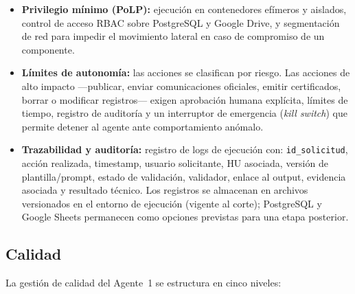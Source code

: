\documentclass[a4paper, 12pt]{article}
\begin{document}
\begin{itemize}
  \item \textbf{Privilegio m\'inimo (\ac{PoLP}):} ejecuci\'on en contenedores ef\'imeros y aislados, control de acceso \ac{RBAC} sobre PostgreSQL y Google Drive, y segmentaci\'on de red para impedir el movimiento lateral en caso de compromiso de un componente.
  \item \textbf{L\'imites de autonom\'ia:} las acciones se clasifican por riesgo. Las acciones de alto impacto ---publicar, enviar comunicaciones oficiales, emitir certificados, borrar o modificar registros--- exigen aprobaci\'on humana expl\'icita, l\'imites de tiempo, registro de auditor\'ia y un interruptor de emergencia (\textit{kill switch}) que permite detener al agente ante comportamiento an\'omalo.
  \item \textbf{Trazabilidad y auditor\'ia:} registro de logs de ejecuci\'on con: \texttt{id\_solicitud}, acci\'on realizada, timestamp, usuario solicitante, \ac{HU} asociada, versi\'on de plantilla/prompt, estado de validaci\'on, validador, enlace al output, evidencia asociada y resultado t\'ecnico. Los registros se almacenan en archivos versionados en el entorno de ejecuci\'on (vigente al corte); PostgreSQL y Google Sheets permanecen como opciones previstas para una etapa posterior.
\end{itemize}

\subsection{Calidad}

La gesti\'on de calidad del Agente~1 se estructura en cinco niveles:
\end{document}
